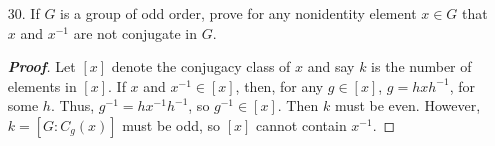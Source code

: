 \documentclass[12pt,leqno]{book}
\theoremstyle{definition}
\newenvironment{Proof}{\begin{proof}[\textnormal{\textbf{Proof}}]}{\end{proof}}
\begin{document}
\begin{enumerate}
\begin{Proof}
Notice that $C(G)$ must have prime power order, hence there is a subgroup of order $p$ in $C(G)$ by Cauchy's Theorem, say $H$. Then $H\unlhd G$ and $|G/H|=p^{\alpha}$ hence, for $\beta\leq\alpha+1$, by the inductive hypothesis, there is a group $W$ of order $p^{\beta-1}$ of $G/H$. Let $\phi:G\to G/H$ be given by \[\phi(g)=gH\] be the canonical quotient map. Then $\phi^{-1}(W)$ is a subgroup of $G$, and since $\phi$ is surjective, its order is $p^{\beta-1}|\ker\phi|=p^{\beta}$, which completes the proof.  
\end{Proof}

 \item [30.] If $G$ is a group of odd order, prove for any nonidentity element $x\in G$ that $x$ and $x^{-1}$ are not conjugate in $G$.

\begin{Proof}
 Let $[x]$ denote the conjugacy class of $x$ and say $k$ is the number of elements in $[x]$. If $x$ and $x^{-1}\in[x]$, then, for any $g\in[x]$, $g=hxh^{-1}$, for some $h$. Thus, $g^{-1}=hx^{-1}h^{-1}$, so $g^{-1}\in[x]$. Then $k$ must be even. However, $k=[G:C_g(x)]$ must be odd, so $[x]$ cannot contain $x^{-1}$.
\end{Proof}

\end{enumerate}
\end{document}
